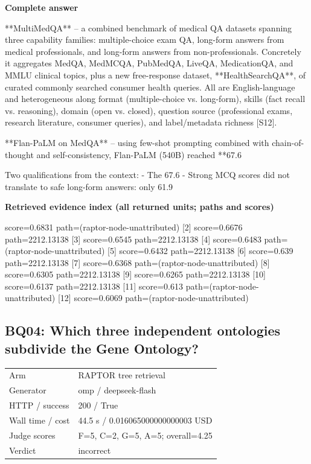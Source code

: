 \documentclass[10pt]{article}
\begin{document}
\textbf{Complete answer}
\begin{AnswerText}
**MultiMedQA** -- a combined benchmark of medical QA datasets spanning three capability families: multiple-choice exam QA, long-form answers from medical professionals, and long-form answers from non-professionals. Concretely it aggregates MedQA, MedMCQA, PubMedQA, LiveQA, MedicationQA, and MMLU clinical topics, plus a new free-response dataset, **HealthSearchQA**, of curated commonly searched consumer health queries. All are English-language and heterogeneous along format (multiple-choice vs. long-form), skills (fact recall vs. reasoning), domain (open vs. closed), question source (professional exams, research literature, consumer queries), and label/metadata richness [S12].

**Flan-PaLM on MedQA** -- using few-shot prompting combined with chain-of-thought and self-consistency, Flan-PaLM (540B) reached **67.6%

Two qualifications from the context:
- The 67.6%
- Strong MCQ scores did not translate to safe long-form answers: only 61.9%
\end{AnswerText}

\textbf{Retrieved evidence index (all returned units; paths and scores) }
\begin{EvidenceText}
[1] score=0.6831 path=(raptor-node-unattributed)
[2] score=0.6676 path=2212.13138
[3] score=0.6545 path=2212.13138
[4] score=0.6483 path=(raptor-node-unattributed)
[5] score=0.6432 path=2212.13138
[6] score=0.639 path=2212.13138
[7] score=0.6368 path=(raptor-node-unattributed)
[8] score=0.6305 path=2212.13138
[9] score=0.6265 path=2212.13138
[10] score=0.6137 path=2212.13138
[11] score=0.613 path=(raptor-node-unattributed)
[12] score=0.6069 path=(raptor-node-unattributed)
\end{EvidenceText}
\subsection{BQ04: Which three independent ontologies subdivide the Gene Ontology?}
\begin{tabular}{@{}ll@{}}
Arm & RAPTOR tree retrieval\\
Generator & omp / deepseek-flash\\
HTTP / success & 200 / True\\
Wall time / cost & 44.5 s / 0.016065000000000003 USD\\
Judge scores & F=5, C=2, G=5, A=5; overall=4.25\\
Verdict & incorrect\\
\end{tabular}
\end{document}
